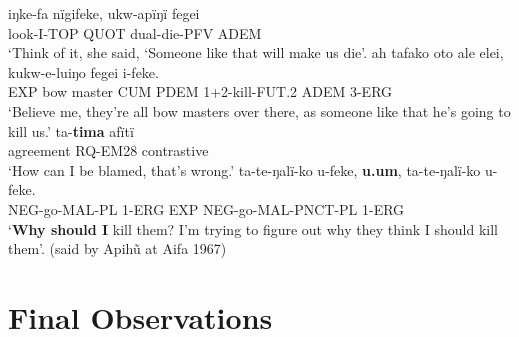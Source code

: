 \documentclass[output=paper]{langsci/langscibook}
\begin{document}
\begin{exe}
\ex \label{ex:eb71}
	\begin{xlist}
	\ex 
	\gll iŋke-fa nïgifeke, ukw-apïŋï fegei\\
	look-I-TOP QUOT dual-die-PFV ADEM\\
	\trans ‘Think of it, she said, ‘Someone like that will make us die’.
	\ex 
	\gll ah tafako oto ale elei, kukw-e-luiŋo fegei i-feke.\\
	EXP bow master CUM PDEM 1+2-kill-FUT.2 ADEM 3-ERG\\
	\trans ‘Believe me, they’re all bow masters over there, as someone like that he’s going to kill us.’
	\ex
	 ta-\textbf{tima} afïtï\\
	agreement RQ-EM28 contrastive\\
	\trans ‘How can I be blamed, that’s wrong.’
	\ex
	\gll ta-te-ŋalï-ko u-feke, \textbf{u.um}, ta-te-ŋalï-ko u-feke.\\
	NEG-go-MAL-PL 1-ERG EXP NEG-go-MAL-PNCT-PL 1-ERG\\
 	\trans ‘\textbf{Why should I} kill them?  I’m trying to figure out why they think I should kill them’. (said by Apihũ at Aifa 1967)
\end{xlist}
\end{exe}


%	



\section{Final Observations}\label{s:eb5}
\end{document}
